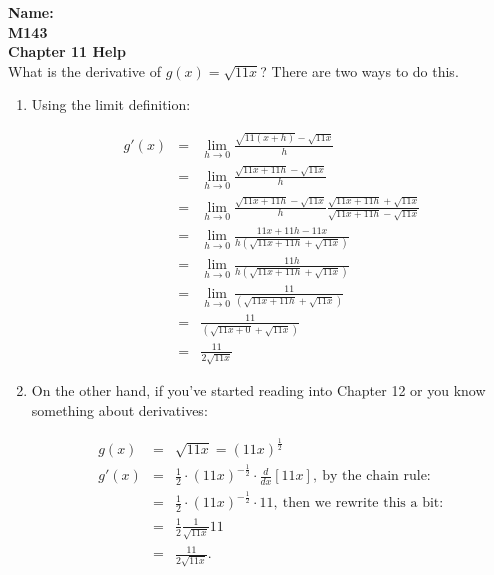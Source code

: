 \documentclass[10pt]{article}
\theoremstyle{definition}
\newcommand{\limit}[2]{\displaystyle{ \lim_{#1 \to #2}}}
\begin{document}
%

{\bf Name:} \hrulefill\hrulefill\hrulefill\\
{\bf M143} \qquad \qquad \\
{\bf Chapter 11 Help}\\ %

What is the derivative of $g(x)=\sqrt{11x}$?  There are two ways to do this.

\begin{enumerate}
\item Using the limit definition:

\begin{eqnarray*}
g'(x)&=&\limit{h}{0}\frac{\sqrt{11(x+h)}-\sqrt{11x}}{h}\\
&=&\limit{h}{0}\frac{\sqrt{11x+11h}-\sqrt{11x}}{h}\\
&=&\limit{h}{0}\frac{\sqrt{11x+11h}-\sqrt{11x}}{h}\frac{\sqrt{11x+11h}+\sqrt{11x}}{\sqrt{11x+11h}-\sqrt{11x}}\\
&=&\limit{h}{0}\frac{11x+11h-11x}{h(\sqrt{11x+11h}+\sqrt{11x})}\\
&=&\limit{h}{0}\frac{11h}{h(\sqrt{11x+11h}+\sqrt{11x})}\\
&=&\limit{h}{0}\frac{11}{(\sqrt{11x+11h}+\sqrt{11x})}\\
&=&\frac{11}{(\sqrt{11x+0}+\sqrt{11x})}\\
&=&\frac{11}{2\sqrt{11x}}
\end{eqnarray*}

\item On the other hand, if you've started reading into Chapter 12 or you know something about derivatives:

\begin{eqnarray*}
g(x)&=&\sqrt{11x}=(11x)^{\frac{1}{2}}\\
g'(x)&=&\frac{1}{2}\cdot(11x)^{-\frac{1}{2}}\cdot\frac{d}{dx}[11x],\ \text{by the chain rule:}\\
&=&\frac{1}{2}\cdot(11x)^{-\frac{1}{2}}\cdot11,\ \text{then we rewrite this a bit}:\\
&=&\frac{1}{2}\frac{1}{\sqrt{11x}}11\\
&=&\frac{11}{2\sqrt{11x}}.
\end{eqnarray*}

\end{enumerate}
\end{document}
